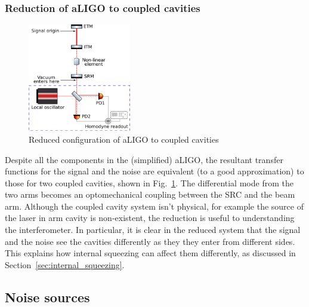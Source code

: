 \documentclass[aps,pra,superscriptaddress,reprint,nofootinbib]{revtex4-1}
\begin{document}
\subsubsection{Reduction of aLIGO to coupled cavities}

\begin{figure}
	\begin{center}
	\includegraphics[width=0.4\textwidth]{figures/aLIGO_as_coupled_cavities.pdf}
	\end{center}
	\caption{Reduced configuration of aLIGO to coupled cavities}
	\label{fig:aLIGO_as_coupled_cavities}
\end{figure}

Despite all the components in the (simplified) aLIGO, the resultant transfer functions for the signal and the noise are equivalent (to a good approximation) to those for two coupled cavities, shown in Fig.~\ref{fig:aLIGO_as_coupled_cavities}. The differential mode from the two arms becomes an optomechanical coupling between the SRC and the beam arm.
Although the coupled cavity system isn’t physical, for example the source of the laser in arm cavity is non-existent, the reduction is useful to understanding the interferometer. In particular, it is clear in the reduced system that the signal and the noise see the cavities differently as they they enter from different sides. This explains how internal squeezing can affect them differently, as discussed in Section~\ref{sec:internal_squeezing}.


\subsection{Noise sources}
\label{sec:noise_sources}
\end{document}
